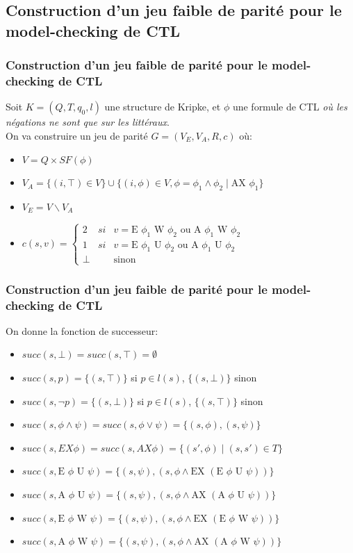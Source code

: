 \documentclass[11pt]{beamer}
\begin{document}
\subsection{Construction d'un jeu faible de parité pour le model-checking de CTL}

\begin{frame}
	\frametitle{Construction d'un jeu faible de parité pour le model-checking de CTL}
Soit $K = (Q,T,q_0,l)$  une structure de Kripke, et $\phi$ une formule de CTL \emph{où les négations ne sont que sur les littéraux}.\\
On va construire un jeu de parité $G = (V_E,V_A,R,c)$ où:
	\begin{itemize}
		\item $V = Q \times SF(\phi)$
		\item $V_A = \{(i, \top ) \in V\} \cup \{(i, \phi) \in V, \phi = \phi_1 \land \phi_2 \mid \mbox{AX } \phi_1 \}$
		\item $V_E = V \backslash V_A$
		\item $c(s,v) = \left \{
		\begin{array}{rcl}
		2 & si & v = \mbox{E } \phi_1 \mbox{ W } \phi_2\text{ ou }\mbox{A } \phi_1 \mbox{ W } \phi_2\\
		1 & si & v = \mbox{E } \phi_1 \mbox{ U } \phi_2\text{ ou }\mbox{A } \phi_1 \mbox{ U } \phi_2\\
		\bot && \text{sinon}
		\end{array}
		\right .$
	\end{itemize}
\end{frame}

\begin{frame}
	\frametitle{Construction d'un jeu faible de parité pour le model-checking de CTL}
On donne la fonction de successeur:
	\begin{itemize}
		\item$ succ(s, \bot) = succ(s, \top) = \emptyset$
		\item $succ(s, p) = \{(s,\top)\}$ si $p \in l(s)$, $\{(s,\bot)\}$ sinon
		\item $succ(s, \neg p) = \{(s,\bot)\}$ si $p \in l(s)$, $\{(s,\top)\}$ sinon
		\item $succ(s,\phi \land \psi) = succ(s, \phi \lor \psi) = \{(s,\phi), (s,\psi) \}$
		\item $succ(s,EX \phi) = succ(s, AX \phi) = \{ (s', \phi) \mid (s,s') \in T \} $
		\item $succ(s, \mbox{E } \phi \mbox{ U } \psi) = \{ (s,\psi), (s, \phi \land \mbox{EX }  (\mbox{E } \phi \mbox{ U } \psi)) \}$
		\item $succ(s, \mbox{A } \phi \mbox{ U } \psi) = \{ (s,\psi), (s, \phi \land \mbox{AX }  (\mbox{A } \phi \mbox{ U } \psi)) \}$
		\item $succ(s, \mbox{E } \phi \mbox{ W } \psi) = \{ (s,\psi), (s, \phi \land \mbox{EX }  (\mbox{E } \phi \mbox{ W } \psi)) \}$
		\item $succ(s, \mbox{A } \phi \mbox{ W } \psi) = \{ (s,\psi), (s, \phi \land \mbox{AX } (\mbox{A } \phi \mbox{ W } \psi)) \}$
	\end{itemize}
\end{frame}
\end{document}
